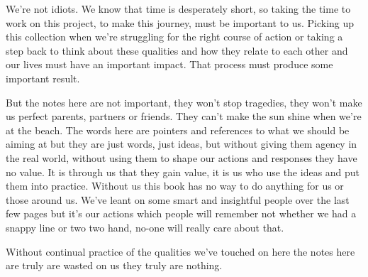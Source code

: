 \cleardoublepage
{ \small

We’re not idiots. We know that time is desperately short, so taking the time to work on this project, to make this journey, must be important to us. Picking up this collection when we’re struggling for the right course of action or taking a step back to think about these qualities and how they relate to each other and our lives must have an important impact. That process must produce some important result. 

But the notes here are not important, they won't stop tragedies, they won't make us perfect parents, partners or friends. They can't make the sun shine when we're at the beach. The words here are pointers and references to what we should be aiming at but they are just words, just ideas, but without giving them agency in the real world, without using them to shape our actions and responses they have no value. It is through us that they gain value, it is us who use the ideas and put them into practice. Without us this book has no way to do anything for us or those around us. We've leant on some smart and insightful people over the last few pages but it's our actions which people will remember not whether we had a snappy line or two two hand, no-one will really care about that.

Without continual practice of the qualities we've touched on here the notes here are truly are wasted on us they truly are nothing. 





}